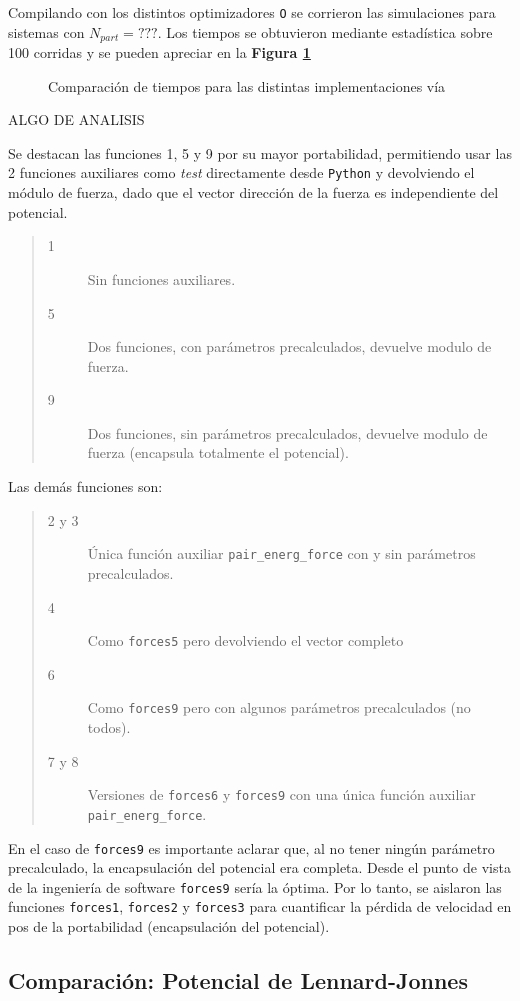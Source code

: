 \documentclass[twoside, 12pt]{article}
\begin{document}
Compilando con los distintos optimizadores \texttt{O} se corrieron las simulaciones para sistemas con $N_{part}=???$. Los tiempos se obtuvieron mediante estadística sobre 100 corridas y se pueden apreciar en la \textbf{Figura \ref{fig:CompTodas}}

\begin{figure}[h]
	\centering
	\caption{Comparación de tiempos para las distintas implementaciones vía}
	\label{fig:CompTodas}
\end{figure}

ALGO DE ANALISIS

Se destacan las funciones 1, 5 y 9 por su mayor portabilidad, permitiendo usar las 2 funciones auxiliares como \textit{test} directamente desde \texttt{Python} y devolviendo el módulo de fuerza, dado que el vector dirección de la fuerza es independiente del potencial.

\begin{quote}
\begin{description}
\item[1] Sin funciones auxiliares.
\item[5] Dos funciones, con parámetros precalculados, devuelve modulo de fuerza.
\item[9] Dos funciones, sin parámetros precalculados, devuelve modulo de fuerza (encapsula totalmente el potencial).
\end{description}
\end{quote}

Las demás funciones son:

\begin{quote}
\begin{description}
\item[2 y 3] Única función auxiliar \texttt{pair\_energ\_force} con y sin parámetros precalculados.
\item[4] Como \texttt{forces5} pero devolviendo el vector completo
\item[6] Como \texttt{forces9} pero con algunos parámetros precalculados (no todos).
\item[7 y 8] Versiones de \texttt{forces6} y \texttt{forces9} con una única función auxiliar \texttt{pair\_energ\_force}.
\end{description}
\end{quote}

En el caso de \texttt{forces9} es importante aclarar que, al no tener ningún parámetro precalculado, la encapsulación del potencial era completa. Desde el punto de vista de la ingeniería de software \texttt{forces9} sería la óptima. Por lo tanto, se aislaron las funciones \texttt{forces1}, \texttt{forces2} y \texttt{forces3} para cuantificar la pérdida de velocidad en pos de la portabilidad (encapsulación del potencial).

\subsection{Comparación: Potencial de Lennard-Jonnes}

	
\end{document}
